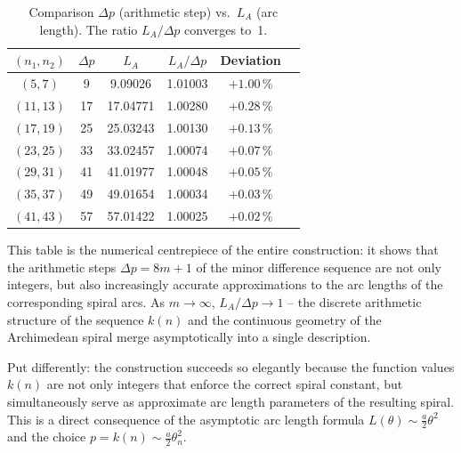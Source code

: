 \begin{table}[H]
\centering
\caption{Comparison $\Delta p$ (arithmetic step) vs.\  $L_A$ (arc length).
  The ratio $L_A / \Delta p$ converges to~1.}
\renewcommand{\arraystretch}{1.2}
\begin{tabular}{cccccc}
\toprule
$(n_1, n_2)$ & $\Delta p$ & $L_A$ & $L_A / \Delta p$ & Deviation \\
\midrule
$( 5,  7)$ &  9 &  9.09026 & 1.01003 & $+1.00\,\%$ \\
$(11, 13)$ & 17 & 17.04771 & 1.00280 & $+0.28\,\%$ \\
$(17, 19)$ & 25 & 25.03243 & 1.00130 & $+0.13\,\%$ \\
$(23, 25)$ & 33 & 33.02457 & 1.00074 & $+0.07\,\%$ \\
$(29, 31)$ & 41 & 41.01977 & 1.00048 & $+0.05\,\%$ \\
$(35, 37)$ & 49 & 49.01654 & 1.00034 & $+0.03\,\%$ \\
$(41, 43)$ & 57 & 57.01422 & 1.00025 & $+0.02\,\%$ \\
\bottomrule
\end{tabular}
\end{table}

\begin{bemerkung}
This table is the numerical centrepiece of the entire construction: it shows
that the arithmetic steps $\Delta p = 8m+1$ of the minor difference sequence
are not only integers, but also increasingly accurate approximations to the
arc lengths of the corresponding spiral arcs. As $m \to \infty$,
$L_A / \Delta p \to 1$ -- the discrete arithmetic structure of the sequence $k(n)$
and the continuous geometry of the Archimedean spiral merge
asymptotically into a single description.

Put differently: the construction succeeds so elegantly because the
function values $k(n)$ are not only integers that enforce the correct spiral constant,
but simultaneously serve as approximate arc length parameters of the
resulting spiral. This is a direct consequence
of the asymptotic arc length formula $L(\theta) \sim \frac{a}{2}\theta^2$ and
the choice $p = k(n) \sim \frac{a}{2}\theta_n^2$.
\end{bemerkung}
